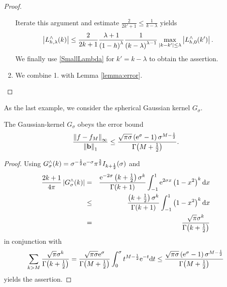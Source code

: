 \begin{proof}
\begin{enumerate}
    Iterate this argument and estimate $\frac{2}{2k'+1}\le
    \frac{1}{k-\lambda}$ yields
    \begin{align*}
      \left|L_{h,\lambda}^{\wedge}{\hspace{-0.4ex}}\left(k\right)\right|
      & \le \frac{2}{2k+1} \frac{\lambda+1}{\left(1-h\right)^{\lambda}}
        \frac{1}{\left(k-\lambda\right)^{\lambda-1}} 
        \max_{|k-k'| \le \lambda} 
        \left\vert L_{h,0}^{\wedge}{\hspace{-0.4ex}}\left(k'\right)\right\vert.
    \end{align*}
    We finally use \eqref{SmallLambda} for $k'=k-\lambda$ to obtain the
    assertion.
  \item We combine 1. with Lemma \ref{lemma:error}. 
  \end{enumerate}
\end{proof}

As the last example, we consider the spherical Gaussian kernel $G_{\sigma}$. 

\begin{lemma}
  The Gaussian-kernel $G_{\sigma}$ obeys the error bound
  \begin{equation}
    \label{error:G}
    \frac{\left\|f - f_{M}\right\|_{\infty}}{\left\|\mathbf{b}\right\|_1} \le
    \frac{\sqrt{\pi\sigma}\left(\mbox{\rm{e}}^{\sigma}-1\right) \sigma^{M-\frac{1}{2}}}{\Gamma{\hspace{-0.4ex}}\left(M
    +\frac{1}{2}\right)}.
  \end{equation} 
\end{lemma}
\begin{proof}
  Using $G_{\sigma}^{\wedge}{\hspace{-0.4ex}}\left(k\right) = \sigma^{-\frac{1}{2}} \mbox{\rm{e}}^{-\sigma}
  \pi^{\frac{3}{2}} I_{k+\frac{1}{2}}{\hspace{-0.4ex}}\left(\sigma\right)$ and
  \begin{eqnarray*}
    \frac{2k+1}{4\pi} \left\vert G_{\sigma}^{\wedge}{\hspace{-0.4ex}}\left(k\right)\right\vert
    &=&
    \frac{\mbox{\rm{e}}^{-2\sigma}
    \left(k+\frac{1}{2}\right)\sigma^k}{\Gamma{\hspace{-0.4ex}}\left(k+1\right)} \int_{-1}^{1}
    \mbox{\rm{e}}^{2\sigma x} \left(1-x^2\right)^k \text{\rm{d}} x\\
    &\le&
    \frac{\left(k+\frac{1}{2}\right)\sigma^k}{\Gamma{\hspace{-0.4ex}}\left(k+1\right)}
    \int_{-1}^{1} \left(1-x^2\right)^k \text{\rm{d}} x\\
    &=&
    \frac{\sqrt{\pi}\sigma^k}{\Gamma{\hspace{-0.4ex}}\left(k+\frac{1}{2}\right)}
  \end{eqnarray*}
  in conjunction with
  \begin{equation*}
    \sum_{k>M} \frac{\sqrt{\pi}\sigma^k}{\Gamma{\hspace{-0.4ex}}\left(k+\frac{1}{2}\right)}\\
    =
    \frac{\sqrt{\pi\sigma}\mbox{\rm{e}}^{\sigma}}{\Gamma{\hspace{-0.4ex}}\left(M+\frac{1}{2}\right)} 
    \int_{0}^{\sigma} t^{M-\frac{1}{2}} \mbox{\rm{e}}^{-t} \text{\rm{d}} t\\
    \le
    \frac{\sqrt{\pi\sigma}\left(\mbox{\rm{e}}^{\sigma}-1\right) \sigma^{M-\frac{1}{2}}}{\Gamma{\hspace{-0.4ex}}\left(M
    +\frac{1}{2}\right)}
  \end{equation*}
  yields the assertion.
\end{proof}

